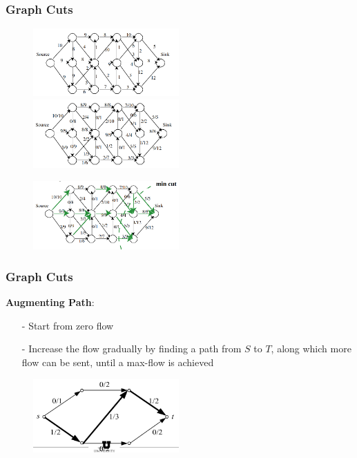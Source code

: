 \documentclass[notheorems,mathserif,table,compress]{beamer}  %
\begin{document}
\begin{frame}
\frametitle{Graph Cuts}
    \begin{figure}[!ht]
    \begin{minipage}[t]{0.45\linewidth}
    \centering
    \includegraphics[width=2.2in]{flow_road1.png}
    \end{minipage}
    \begin{minipage}[t]{0.45\linewidth}
    \centering
    \includegraphics[width=2.2in]{flow_road2.png}
    \end{minipage}
    \end{figure}
    \begin{figure}[!ht]
    \begin{minipage}[t]{0.45\linewidth}
    \centering
    \includegraphics[width=2.2in]{flow_road3.png}
    \end{minipage}
    \end{figure}
\end{frame}

\begin{frame}
\frametitle{Graph Cuts}
\textbf{Augmenting Path}:
\begin{itemize}
\item[-] Start from zero flow
\item[-] Increase the flow gradually by finding a path from $S$ to $T$, along which more flow can be sent, until a max-flow is achieved
\end{itemize}
  \begin{figure}[!ht]
  \centering
   \includegraphics[width=2.2in]{augment.png}
   \end{figure}
\end{frame}
\end{document}
